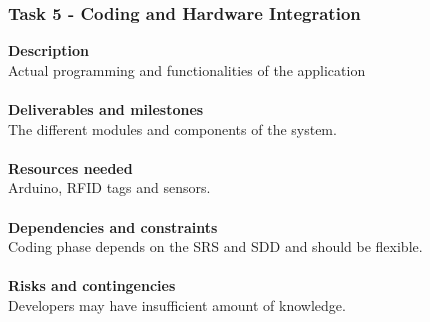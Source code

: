 \documentclass[10pt]{article}
\begin{document}
\subsubsection{Task 5 - Coding and Hardware Integration}
\textbf{Description}\\
Actual programming and functionalities of the application\\ \\
\textbf{Deliverables and milestones}\\
The different modules and components of the system.\\ \\
\textbf{Resources needed}\\
Arduino, RFID tags and sensors.\\ \\
\textbf{Dependencies and constraints}\\
Coding phase depends on the SRS and SDD and should be flexible.\\ \\
\textbf{Risks and contingencies}\\
Developers may have insufficient amount of knowledge.\\ \\	

\newpage
\end{document}
